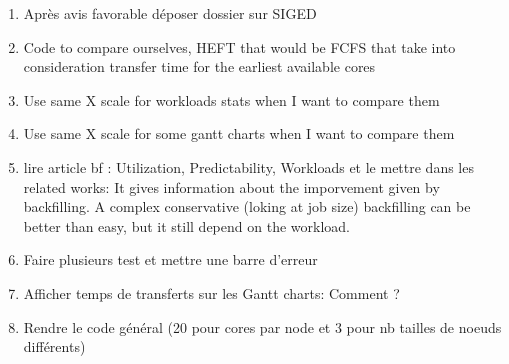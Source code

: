\documentclass[a4paper]{article}
\begin{document}
\begin{enumerate}
			\item Après avis favorable déposer dossier sur SIGED
			\item Code to compare ourselves, HEFT that would be FCFS that take into consideration transfer time for the earliest available cores
			\item Use same X scale for workloads stats when I want to compare them
			\item Use same X scale for some gantt charts when I want to compare them
			\item lire article bf : Utilization, Predictability, Workloads et le mettre dans les related works: It gives information about the imporvement given by backfilling. A complex conservative (loking at job size) backfilling can be better than easy, but it still depend on the workload.
			\item Faire plusieurs test et mettre une barre d'erreur
			\item Afficher temps de transferts sur les Gantt charts: Comment ?
			\item Rendre le code général (20 pour cores par node et 3 pour nb tailles de noeuds différents)
		\end{enumerate}
		
\end{document}
